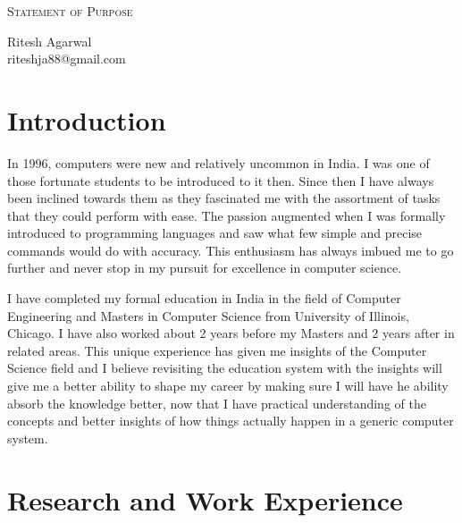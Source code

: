 \documentclass[letterpaper]{article}
\makeatletter
\newcommand{\soptitle}{Statement of Purpose}
\newcommand{\yourname}{Ritesh Agarwal}
\newcommand{\youremail}{riteshja88@gmail.com}
\newcommand{\amper}{{\fontspec[Scale=.95]{Helvetica}\selectfont\itshape\&~{}}}
\makeatother
\begin{document}
\begin{center}{\huge \scshape \soptitle}\end{center}
\begin{center}\vspace{0.2em} {\Large \yourname\\}
  {\youremail}\end{center}

\section*{Introduction}

In 1996, computers were new and relatively uncommon in India. 
I was one of those fortunate students to be introduced to it then. 
Since then I have always been inclined towards  them as they  
fascinated me with the assortment  of tasks  that  they  could  perform  with ease.
The passion augmented when I was formally introduced to programming languages and saw 
what few simple and precise commands would do with accuracy.
This enthusiasm has always imbued me to go further and never stop in my pursuit for 
excellence in computer science.

I have completed my formal education in India in the field of Computer Engineering and Masters in Computer Science 
from University of Illinois, Chicago. I have also worked about 2 years before my Masters and 2 years after in 
related areas.
This unique experience has given me insights of the Computer Science field and I believe revisiting the 
education system with the insights will give me a better ability to shape my career by making sure 
I will have he ability absorb the knowledge better,
now that I have practical understanding of the concepts and better insights of 
how things actually happen in a generic computer system.

\section*{Research and Work Experience}
\end{document}
